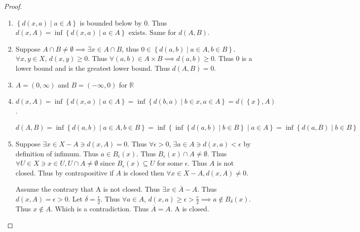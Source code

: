 \documentclass{article}
\newcommand*{\subeq}{\subseteq}
\newcommand*{\empset}{\emptyset}
\newcommand{\R}{\mathbb{R}}
\begin{document}
\begin{proof}
    \begin{enumerate}
        \item $\left\{ d(x, a) \mid a \in A \right\}$ is bounded below by 0. Thus $d(x, A) = \inf\left\{ d(x, a) \mid a \in A \right\}$ exists. Same for $d(A, B)$.
        \item Suppose $A \cap B \neq \empset \implies \exists x \in A \cap B$, thus $0 \in \left\{ d(a, b) \mid a \in A, b \in B \right\}$. $\forall x, y \in X$, $d(x, y) \geq 0$. Thus $\forall (a, b) \in A \times B \implies d(a, b) \geq 0$. Thus 0 is a lower bound and is the greatest lower bound. Thus $d(A, B) = 0$.         
        \item $A = (0, \infty)$ and $B = (-\infty, 0)$ for $\R$  
        \item $d(x, A) = \inf\left\{ d(x, a) \mid a \in A \right\} = \inf\left\{ d(b, a) \mid b \in {x}, a \in A \right\} = d(\left\{ x \right\}, A)$. 
        
        $d(A, B) = \inf\left\{ d(a, b) \mid a \in A, b \in B \right\} = \inf\left\{ \inf\left\{ d(a, b) \mid b \in B \right\} \mid a \in A \right\} = \inf\left\{ d(a, B) \mid b \in B \right\}$
        
        \item Suppose $\exists x \in X - A \ni d(x, A) = 0$. Thus $\forall \epsilon > 0$, $\exists a \in A \ni d(x, a) < \epsilon$ by definition of infimum. Thus $a \in B_{\epsilon}(x)$. Thus $B_{\epsilon}(x) \cap A \neq \empset$. Thus $\forall U \in X \ni x \in U, U \cap A \neq \empset$ since $B_{\epsilon}(x) \subeq U$ for some $\epsilon$. Thus $A$ is not closed. Thus by contrapositive if $A$ is closed then $\forall x \in X - A, d(x, A) \neq 0$. 
        
        Assume the contrary that A is not closed. Thus $\exists x \in \overline{A} - A$. Thus $d(x, A) = \epsilon > 0$. Let $\delta = \frac{\epsilon}{2}$. Thus $\forall a \in A$, $d(x, a) \geq \epsilon > \frac{e}{2} \implies a \not \in B_{\delta}(x)$. Thus $x \not \in A$. Which is a contradiction. Thus $\overline{A} = A$. A is closed.         
    \end{enumerate}
    
\end{proof}

\bigskip
\end{document}
